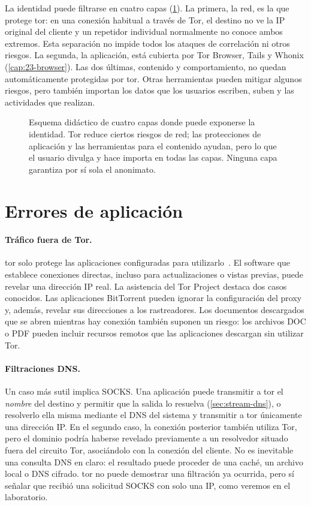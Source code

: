 La identidad puede filtrarse en cuatro capas (\cref{fig:livelli}). La primera, la red, es la que protege tor: en una conexión habitual a través de Tor, el destino no ve la IP original del cliente y un repetidor individual normalmente no conoce ambos extremos. Esta separación no impide todos los ataques de correlación ni otros riesgos. La segunda, la aplicación, está cubierta por Tor Browser, Tails y Whonix (\cref{cap:23-browser}). Las dos últimas, contenido y comportamiento, no quedan automáticamente protegidas por tor. Otras herramientas pueden mitigar algunos riesgos, pero también importan los datos que los usuarios escriben, suben y las actividades que realizan.

\begin{figure}[htbp]
\centering

\caption{Esquema didáctico de cuatro capas donde puede exponerse la identidad. Tor reduce ciertos riesgos de red; las protecciones de aplicación y las herramientas para el contenido ayudan, pero lo que el usuario divulga y hace importa en todas las capas. Ninguna capa garantiza por sí sola el anonimato.}
\label{fig:livelli}
\end{figure}

\section{Errores de aplicación}\label{sec:opsec-applicazione}

\paragraph{Tráfico fuera de Tor.} tor solo protege las aplicaciones configuradas para utilizarlo~\cite{torsafety}. El software que establece conexiones directas, incluso para actualizaciones o vistas previas, puede revelar una dirección IP real. La asistencia del Tor Project destaca dos casos conocidos. Las aplicaciones BitTorrent pueden ignorar la configuración del proxy y, además, revelar sus direcciones a los rastreadores. Los documentos descargados que se abren mientras hay conexión también suponen un riesgo: los archivos DOC o PDF pueden incluir recursos remotos que las aplicaciones descargan sin utilizar Tor.

\paragraph{Filtraciones DNS.} Un caso más sutil implica SOCKS. Una aplicación puede transmitir a tor el \emph{nombre} del destino y permitir que la salida lo resuelva (\cref{sec:stream-dns}), o resolverlo ella misma mediante el DNS del sistema y transmitir a tor únicamente una dirección IP. En el segundo caso, la conexión posterior también utiliza Tor, pero el dominio podría haberse revelado previamente a un resolvedor situado fuera del circuito Tor, asociándolo con la conexión del cliente. No es inevitable una consulta DNS en claro: el resultado puede proceder de una caché, un archivo local o DNS cifrado. tor no puede demostrar una filtración ya ocurrida, pero sí señalar que recibió una solicitud SOCKS con solo una IP, como veremos en el laboratorio.

